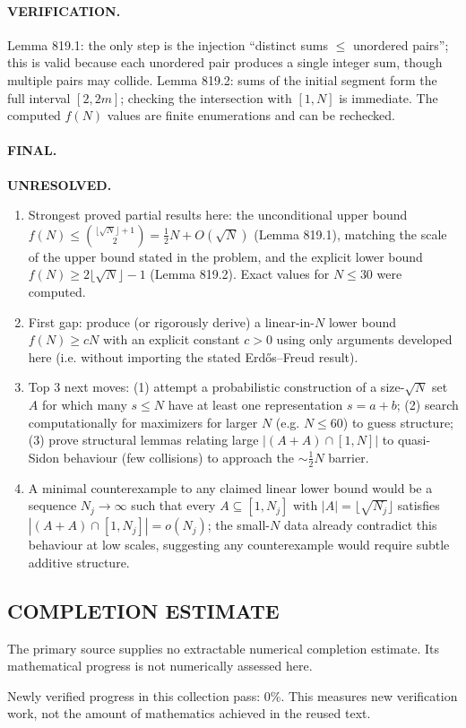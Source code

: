 \paragraph{VERIFICATION.}
Lemma 819.1: the only step is the injection ``distinct sums $\le$ unordered pairs''; this is valid because each unordered pair produces a single integer sum, though multiple pairs may collide.
Lemma 819.2: sums of the initial segment form the full interval $[2,2m]$; checking the intersection with $[1,N]$ is immediate.
The computed $f(N)$ values are finite enumerations and can be rechecked.

\paragraph{FINAL.} \textbf{UNRESOLVED.}
\begin{enumerate}
\item[(i)] Strongest proved partial results here: the unconditional upper bound $f(N)\le \binom{\lfloor\sqrt N\rfloor+1}{2} = \frac{1}{2}N+O(\sqrt N)$ (Lemma 819.1), matching the scale of the upper bound stated in the problem, and the explicit lower bound $f(N)\ge 2\lfloor\sqrt N\rfloor-1$ (Lemma 819.2). Exact values for $N\le 30$ were computed.
\item[(ii)] First gap: produce (or rigorously derive) a linear-in-$N$ lower bound $f(N)\ge cN$ with an explicit constant $c>0$ using only arguments developed here (i.e. without importing the stated Erd\H{o}s--Freud result).
\item[(iii)] Top 3 next moves: (1) attempt a probabilistic construction of a size-$\sqrt N$ set $A$ for which many $s\le N$ have at least one representation $s=a+b$; (2) search computationally for maximizers for larger $N$ (e.g. $N\le 60$) to guess structure; (3) prove structural lemmas relating large $|(A+A)\cap[1,N]|$ to quasi-Sidon behaviour (few collisions) to approach the $\sim \tfrac12 N$ barrier.
\item[(iv)] A minimal counterexample to any claimed linear lower bound would be a sequence $N_j\to\infty$ such that every $A\subseteq[1,N_j]$ with $|A|=\lfloor\sqrt{N_j}\rfloor$ satisfies $|(A+A)\cap[1,N_j]|=o(N_j)$; the small-$N$ data already contradict this behaviour at low scales, suggesting any counterexample would require subtle additive structure.
\end{enumerate}




\subsection*{COMPLETION ESTIMATE}
The primary source supplies no extractable numerical completion estimate. Its mathematical progress is not numerically assessed here.

Newly verified progress in this collection pass: $0\%$. This measures new verification work, not the amount of mathematics achieved in the reused text.
